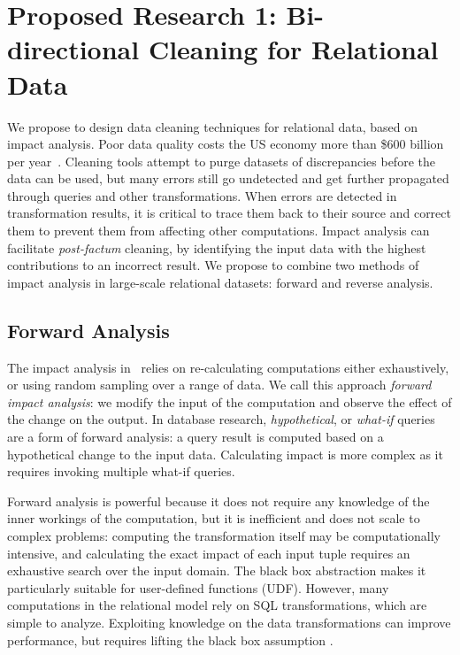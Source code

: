 \section{Proposed Research 1: Bi-directional Cleaning for Relational Data} %
\label{sec:bi_directional}

We propose to design data cleaning techniques for relational data,
based on impact analysis. Poor data quality costs the US economy more
than \$600 billion per year~\cite{eckerson2002}. Cleaning tools
attempt to purge datasets of discrepancies before the data can be
used, but many errors still go undetected and get further propagated
through queries and other transformations. When errors are detected in
transformation results, it is critical to trace them back to their
source and correct them to prevent them from affecting other
computations. Impact analysis can facilitate \emph{post-factum}
cleaning, by identifying the input data with the highest contributions
to an incorrect result. We propose to combine two methods of impact
analysis in large-scale relational datasets: forward and reverse
analysis.

\subsection{Forward Analysis} %
\label{sub:forward_analysis}
The impact analysis in \checkcell\ relies on re-calculating computations either exhaustively, or using random sampling over a range of data. We call this approach \emph{forward impact analysis}: we modify the input of the computation and observe the effect of the change on the output. 
In database research, \emph{hypothetical}, or \emph{what-if} queries \cite{DBLP:conf/vldb/BalminPP00,DBLP:conf/icde/LakshmananRS08} are a form of forward analysis: a query result is computed based on a hypothetical change to the input data.  Calculating impact is more complex as it requires invoking multiple what-if queries. 

Forward analysis is powerful because it does not require any knowledge of the inner workings of the computation, but it is inefficient and does not scale to complex problems: computing the transformation itself may be computationally intensive, and calculating the exact impact of each input tuple requires an exhaustive search over the input domain. The black box abstraction makes it particularly suitable for user-defined functions (UDF). However, many computations in the relational model rely on SQL transformations, which are simple to analyze. Exploiting knowledge on the data transformations can improve performance, but requires lifting the black box assumption .


